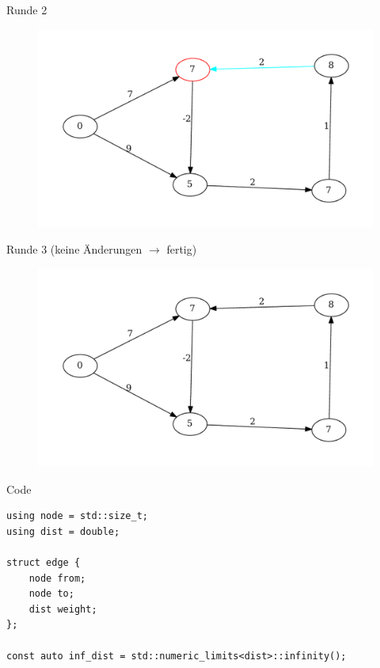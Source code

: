 \begin{frame}{Runde 2}
\begin{figure}[htbp]
\centering
\includegraphics[width=\linewidth]{bellman_ford_graphs/graph_13.pdf}
\end{figure}
\end{frame}
\begin{frame}{Runde 3 (keine Änderungen $\rightarrow$ fertig)}

\begin{figure}[htbp]
\centering
\includegraphics[width=\linewidth]{bellman_ford_graphs/graph_14.pdf}
\end{figure}

\end{frame}

\begin{frame}[fragile]{Code}
\begin{lstlisting}[basicstyle=\footnotesize]
using node = std::size_t;
using dist = double;

struct edge {
    node from;
    node to;
    dist weight;
};

const auto inf_dist = std::numeric_limits<dist>::infinity();
\end{lstlisting}
\end{frame}

